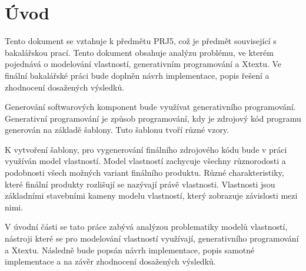 \chapter{Úvod}
Tento dokument se vztahuje k předmětu PRJ5, což je předmět související s bakalářskou prací. Tento dokument obsahuje analýzu problému, ve kterém pojednává o modelování vlastností, generativním programování a Xtextu. Ve finální bakalářské práci bude doplněn návrh implementace, popis řešení a zhodnocení dosažených výsledků.

Generování softwarových komponent bude využívat generativního programování. Generativní programování je způsob programování, kdy je zdrojový kód programu generován na základě šablony. Tuto šablonu tvoří různé vzory.  

K vytvoření šablony, pro vygenerování finálního zdrojového kódu bude v práci využíván model vlastností. Model vlastností zachycuje všechny různorodosti a podobnosti všech možných variant finálního produktu. Různé charakteristiky, které finální produkty rozlišují se nazývají právě vlastnosti. Vlastnosti jsou základními stavebními kameny modelu vlastností, který zobrazuje závislosti mezi nimi.  

V úvodní části se tato práce zabývá analýzou problematiky modelů vlastností, nástroji které se pro modelování vlastností využívají, generativního programování a Xtextu. Následně bude popsán návrh implementace, popis samotné implementace a na závěr zhodnocení dosažených výsledků.


